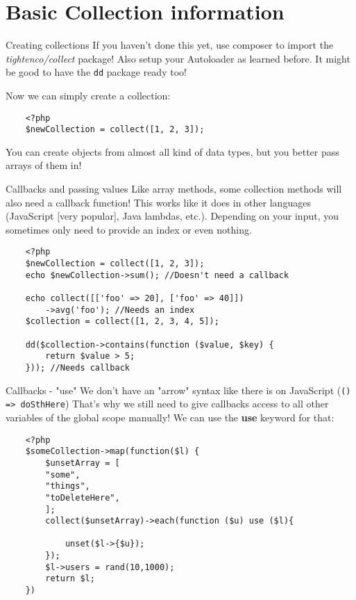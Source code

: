 \section{Basic Collection information}

\begin{frame}[fragile]{Creating collections}
	If you haven't done this yet, use composer to import the \textit{tightenco/collect} package! Also setup your Autoloader as learned before. It might be good to have the \texttt{dd} package ready too! \pause
	
	Now we can simply create a collection:	
	\begin{lstlisting}
	<?php
	$newCollection = collect([1, 2, 3]);
	\end{lstlisting}\pause
	
	You can create objects from almost all kind of data types, but you better pass arrays of them in!
\end{frame}

\begin{frame}[fragile]{Callbacks and passing values}
	Like array methods, some collection methods will also need a callback function! This works like it does in other languages (JavaScript [very popular], Java lambdas, etc.). Depending on your input, you sometimes only need to provide an index or even nothing. \pause
	
	\begin{lstlisting}
	<?php
	$newCollection = collect([1, 2, 3]);
	echo $newCollection->sum(); //Doesn't need a callback
	
	echo collect([['foo' => 20], ['foo' => 40]])
	    ->avg('foo'); //Needs an index 
	$collection = collect([1, 2, 3, 4, 5]);
	
	dd($collection->contains(function ($value, $key) {
		return $value > 5;
	})); //Needs callback
	\end{lstlisting}
\end{frame}

\begin{frame}[fragile]{Callbacks - "use"}
	We don't have an "arrow" syntax like there is on JavaScript (\texttt{() => {doSthHere}}) \pause
	That's why we still need to give callbacks access to all other variables of the global scope manually!
	We can use the \textbf{use} keyword for that:\pause
	
	\begin{lstlisting}
	<?php
	$someCollection->map(function($l) {
		$unsetArray = [
		"some",
		"things",
		"toDeleteHere",
		];
		collect($unsetArray)->each(function ($u) use ($l){
		
			unset($l->{$u});
		});
		$l->users = rand(10,1000);
		return $l;
	})
	\end{lstlisting}
\end{frame}

